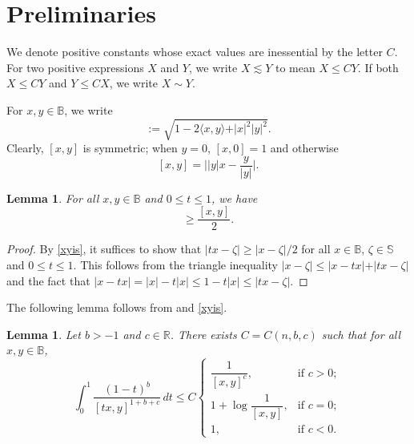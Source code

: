 \documentclass{amsart}
\newtheorem{lemma}[theorem]{Lemma}
\theoremstyle{definition}
\theoremstyle{remark}
\begin{document}
%
\section{Preliminaries}
%

We denote positive constants whose exact values are inessential by
the letter $C$.
For two positive expressions $X$ and $Y$, we write $X\lesssim Y$
to mean $X\leq C Y$.
If both $X\leq CY$ and $Y\leq CX$, we write $X\sim Y$.

For $x,y\in\mathbb B$, we write
\begin{equation*}
  [x,y]:=\sqrt{1-2\langle x,y\rangle+\vert x\vert^2\vert y\vert^2}.
\end{equation*}
Clearly, $[x,y]$ is symmetric; when $y=0$, $[x,0]=1$ and otherwise
\begin{equation}\label{xyis}
[x,y]=\bigl\vert \vert y\vert x-\frac{y}{\vert y\vert}\bigr\vert.
\end{equation}

\begin{lemma}\label{Ltxy}
For all $x,y\in\mathbb B$ and $0\le t\le 1$, we have
\begin{equation*}
[tx,y]\ge\frac{[x,y]}{2}.
\end{equation*}
\end{lemma}

\begin{proof}
By \eqref{xyis}, it suffices to show that
$\vert tx-\zeta\vert\ge\vert x-\zeta\vert/2$ for all
$x\in\mathbb B$, $\zeta\in\mathbb S$ and $0\le t\le 1$.
This follows from the triangle inequality
$\vert x-\zeta\vert\le \vert x-tx\vert +\vert tx-\zeta\vert$ and the fact that
$\vert x-tx\vert=\vert x\vert-t\vert x\vert\le 1-t\vert x\vert\le \vert tx-\zeta\vert$.
\end{proof}

The following lemma follows from \cite[Lemma 2.15]{U} and \eqref{xyis}.
\begin{lemma}\label{LInt01}
Let $b>-1$ and $c\in\mathbb R$.
There exists $C=C(n,b,c)$ such that for all $x,y\in\mathbb B$,
\begin{equation*}
\int_0^1
\frac{(1-t)^b}{[tx,y]^{1+b+c}}\,dt
\le C
\begin{cases}
\dfrac{1}{[x,y]^{c}},&\text{if $c>0$};\\
1+\log\dfrac{1}{[x,y]},&\text{if $c=0$};\\
1,&\text{if $c<0$}.
\end{cases}
\end{equation*}
\end{lemma}
\end{document}
